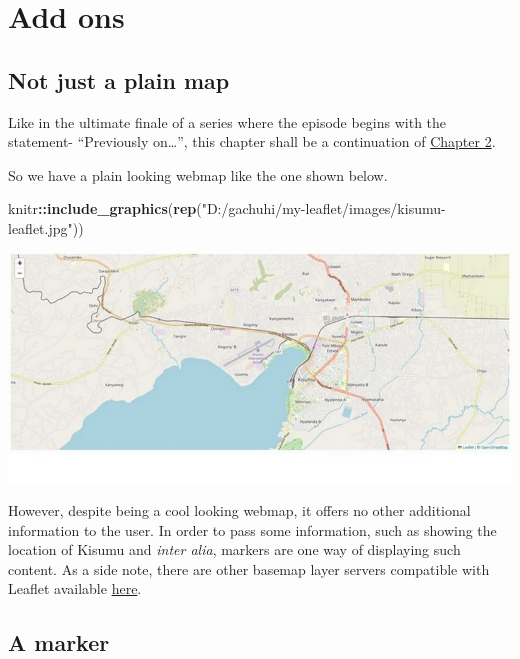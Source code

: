 \documentclass[
]{book}
\newenvironment{Shaded}{\begin{snugshade}}{\end{snugshade}}
\newcommand{\FunctionTok}[1]{\textcolor[rgb]{0.13,0.29,0.53}{\textbf{#1}}}
\newcommand{\NormalTok}[1]{#1}
\newcommand{\SpecialCharTok}[1]{\textcolor[rgb]{0.81,0.36,0.00}{\textbf{#1}}}
\newcommand{\StringTok}[1]{\textcolor[rgb]{0.31,0.60,0.02}{#1}}
\begin{document}
\hypertarget{add-ons}{%
\chapter{Add ons}\label{add-ons}}

\hypertarget{not-just-a-plain-map}{%
\section{Not just a plain map}\label{not-just-a-plain-map}}

Like in the ultimate finale of a series where the episode begins with the statement- ``Previously on\ldots{}'', this chapter shall be a continuation of \protect\hyperlink{first-leaflet-map}{Chapter 2}.

So we have a plain looking webmap like the one shown below.

\begin{Shaded}
\begin{Highlighting}[]
\NormalTok{knitr}\SpecialCharTok{::}\FunctionTok{include\_graphics}\NormalTok{(}\FunctionTok{rep}\NormalTok{(}\StringTok{"D:/gachuhi/my{-}leaflet/images/kisumu{-}leaflet.jpg"}\NormalTok{))}
\end{Highlighting}
\end{Shaded}

\includegraphics{../images/kisumu-leaflet.jpg}

However, despite being a cool looking webmap, it offers no other additional information to the user. In order to pass some information, such as showing the location of Kisumu and \emph{inter alia}, markers are one way of displaying such content. As a side note, there are other basemap layer servers compatible with Leaflet available \href{https://leaflet-extras.github.io/leaflet-providers/preview/}{here}.

\hypertarget{a-marker}{%
\section{A marker}\label{a-marker}}
\end{document}
